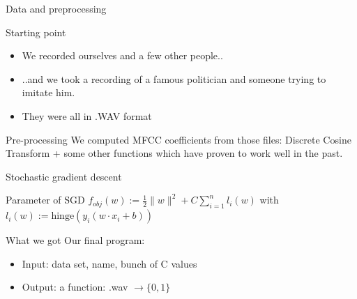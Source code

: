 \documentclass[10pt]{beamer}
\begin{document}
\begin{frame}{Data and preprocessing}
\begin{block}{Starting point}
\begin{itemize}
\item We recorded ourselves and a few other people..
\item ..and we took a recording of a famous politician and someone trying to imitate him. %
\item They were all in .WAV format
\end{itemize}
\end{block}

\begin{block}{Pre-processing}
We computed MFCC coefficients from those files: Discrete Cosine Transform + some other functions which have proven to work well in the past.
\end{block}
\end{frame}

\begin{frame}{Stochastic gradient descent}
\begin{block}{Parameter of SGD}
  $f_{obj}(w) := \frac{1}{2} \|w\|^2 + C\displaystyle\sum\limits_{i=1}^{n}l_i(w)$ with $l_i(w) := \mathrm{hinge}(y_i (w \cdot x_i + b))$
\end{block}

\begin{block}{What we got}
Our final program:
\begin{itemize}
  \item Input: data set, name, bunch of C values
  \item Output: a function: .wav $\rightarrow \{0, 1\}$ 
\end{itemize}
\end{block}
\end{frame}
\end{document}
